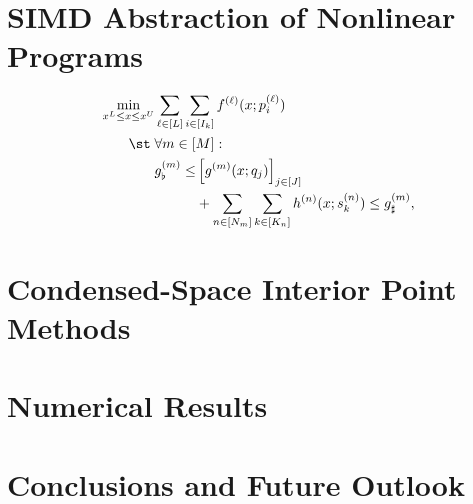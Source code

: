 \section{SIMD Abstraction of Nonlinear Programs}\label{sec:simd}
\begin{subequations}\label{eqn:prob}
  \begin{align}
    \min_{x^L\leq x \leq x^U}& \sum_{\ell\in[L]}\sum_{i\in [I_k]} f^{(\ell)}(x; p^{(\ell)}_i)\\
    \st\; &\forall m\in[M]:\\
    &\begin{aligned}[t]
      g^{(m)}_\flat\leq &\left[g^{(m)}(x; q_j)\right]_{j\in [J]} \\
      &+\sum_{n\in [N_m]}\sum_{k\in [K_n]}h^{(n)}(x; s^{(n)}_{k}) \leq g^{(m)}_\sharp,
    \end{aligned}
  \end{align}
\end{subequations}
\section{Condensed-Space Interior Point Methods}\label{sec:ipm}

\section{Numerical Results}\label{sec:num}

\section{Conclusions and Future Outlook}\label{sec:conc}








